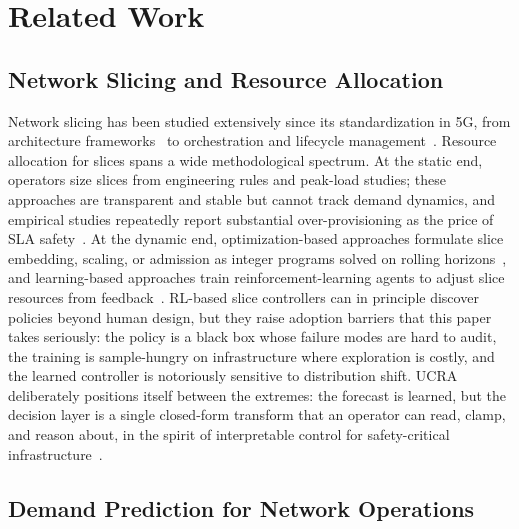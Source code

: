 \section{Related Work}
\label{sec:related}

\subsection{Network Slicing and Resource Allocation}

Network slicing has been studied extensively since its
standardization in 5G, from architecture
frameworks~\cite{rost2017network,afolabi2018slicing} to
orchestration and lifecycle management~\cite{foukas2017networking}.
Resource allocation for slices spans a wide methodological spectrum.
At the static end, operators size slices from engineering rules and
peak-load studies; these approaches are transparent and stable but
cannot track demand dynamics, and empirical studies repeatedly report
substantial over-provisioning as the price of
SLA safety~\cite{sciancalepore2017mobile}. At the dynamic end,
optimization-based approaches formulate slice embedding, scaling, or
admission as integer programs solved on rolling
horizons~\cite{yu2008rethinking}, and learning-based approaches
train reinforcement-learning agents to adjust slice resources from
feedback~\cite{wang2017intelligent,bega2019deepcog}. RL-based slice controllers
can in principle discover policies beyond human design, but they
raise adoption barriers that this paper takes seriously: the policy
is a black box whose failure modes are hard to audit, the training is
sample-hungry on infrastructure where exploration is costly, and the
learned controller is notoriously sensitive to distribution shift.
UCRA deliberately positions itself between the extremes: the forecast
is learned, but the decision layer is a single closed-form transform
that an operator can read, clamp, and reason about, in the spirit of
interpretable control for safety-critical
infrastructure~\cite{rudin2019stop}.

\subsection{Demand Prediction for Network Operations}

